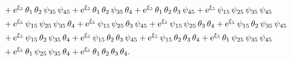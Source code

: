\documentclass[12pt,a4paper,UTF8]{article}
\numberwithin{equation}{section}
\begin{document}
\begin{equation*}
\begin{aligned}
&+{\rm e}^{{{\xi}_{5}}}\,{{\theta}_{1}}\,{{\theta}_{2}}\,{{\psi}_{35}}\,{{\psi}_{45}}+{\rm e}^{{{\xi}_{5}}}\,{{\theta}_{1}}\,{{\theta}_{2}}\,{{\psi}_{35}}\,{{\theta}_{4}}+{\rm e}^{{{\xi}_{5}}}\,{{\theta}_{1}}\,{{\theta}_{2}}\,{{\theta}_{3}}\,{{\psi}_{45}}+{\rm e}^{{{\xi}_{5}}}\,{{\psi}_{15}}\,{{\psi}_{25}}\,{{\psi}_{35}}\,{{\psi}_{45}}\\
&+{\rm e}^{{{\xi}_{5}}}\,{{\psi}_{15}}\,{{\psi}_{25}}\,{{\psi}_{35}}\,{{\theta}_{4}}+{\rm e}^{{{\xi}_{5}}}\,{{\psi}_{15}}\,{{\psi}_{25}}\,{{\theta}_{3}}\,{{\psi}_{45}}+{\rm e}^{{{\xi}_{5}}}\,{{\psi}_{15}}\,{{\psi}_{25}}\,{{\theta}_{3}}\,{{\theta}_{4}}+{\rm e}^{{{\xi}_{5}}}\,{{\psi}_{15}}\,{{\theta}_{2}}\,{{\psi}_{35}}\,{{\psi}_{45}}\\
&+{\rm e}^{{{\xi}_{5}}}\,{{\psi}_{15}}\,{{\theta}_{2}}\,{{\psi}_{35}}\,{{\theta}_{4}}+{\rm e}^{{{\xi}_{5}}}\,{{\psi}_{15}}\,{{\theta}_{2}}\,{{\theta}_{3}}\,{{\psi}_{45}}+{\rm e}^{{{\xi}_{5}}}\,{{\psi}_{15}}\,{{\theta}_{2}}\,{{\theta}_{3}}\,{{\theta}_{4}}+{\rm e}^{{{\xi}_{5}}}\,{{\theta}_{1}}\,{{\psi}_{25}}\,{{\psi}_{35}}\,{{\psi}_{45}}\\
&+{\rm e}^{{{\xi}_{5}}}\,{{\theta}_{1}}\,{{\psi}_{25}}\,{{\psi}_{35}}\,{{\theta}_{4}}+{\rm e}^{{{\xi}_{5}}}\,{{\theta}_{1}}\,{{\theta}_{2}}\,{{\theta}_{3}}\,{{\theta}_{4}} .
\end{aligned}
\end{equation*}
\end{document}
